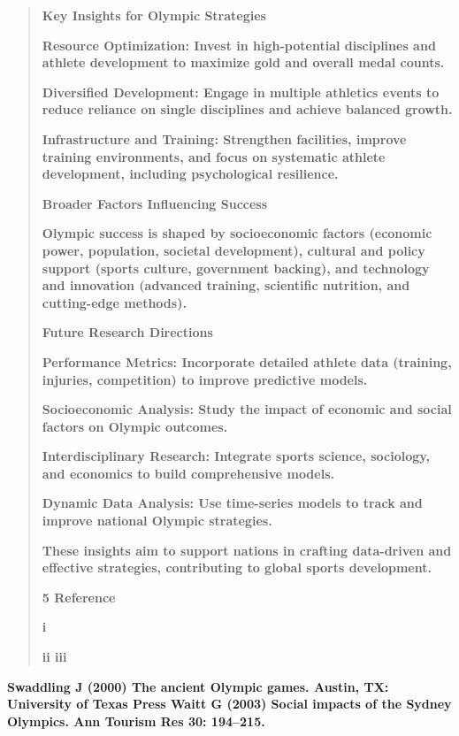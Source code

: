 \documentclass[12pt,a4paper]{article}
\renewenvironment{quote}{\begin{quotation}}{\end{quotation}}  %
\begin{document}
    \begin{quote}
    \textbf{Key Insights for Olympic Strategies}
    
    \textbf{Resource Optimization: Invest in high-potential disciplines and
    athlete development to maximize gold and overall medal counts.}
    
    \textbf{Diversified Development: Engage in multiple athletics events to
    reduce reliance on single disciplines and achieve balanced growth.}
    
    \textbf{Infrastructure and Training: Strengthen facilities, improve
    training environments, and focus on systematic athlete development,
    including psychological resilience.}
    
    \textbf{Broader Factors Influencing Success}
    
    \textbf{Olympic success is shaped by socioeconomic factors (economic
    power, population, societal development), cultural and policy support
    (sports culture, government backing), and technology and innovation
    (advanced training, scientific nutrition, and cutting-edge methods).}
    
    \textbf{Future Research Directions}
    
    \textbf{Performance Metrics: Incorporate detailed athlete data
    (training, injuries, competition) to improve predictive models.}
    
    \textbf{Socioeconomic Analysis: Study the impact of economic and social
    factors on Olympic outcomes.}
    
    \textbf{Interdisciplinary Research: Integrate sports science, sociology,
    and economics to build comprehensive models.}
    
    \textbf{Dynamic Data Analysis: Use time-series models to track and
    improve national Olympic strategies.}
    
    \textbf{These insights aim to support nations in crafting data-driven
    and effective strategies, contributing to global sports development.}
    
    \protect{}\label{bookmark23-1}{}\textbf{5 Reference}
    
    \textbf{i}
    
    \textbf{ii iii}
    \end{quote}
    
    \textbf{Swaddling J (2000) The ancient Olympic games. Austin, TX:
    University of Texas Press Waitt G (2003) Social impacts of the Sydney
    Olympics. Ann Tourism Res 30: 194--215.}
    
\end{document}
